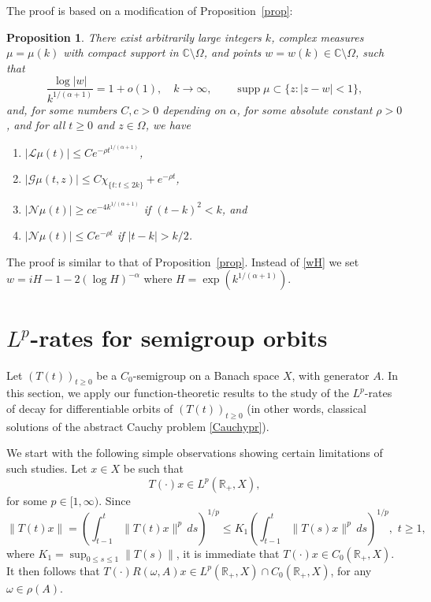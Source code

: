\documentclass[11pt]{amsart}
\newtheorem{proposition}[theorem]{Proposition}
\theoremstyle{definition}
\theoremstyle{remark}
\numberwithin{equation}{section}
\begin{document}
The proof is based on a modification of Proposition~\ref{prop}:

\begin{proposition}\label{propA}
There exist arbitrarily large integers $k$, complex measures $\mu=\mu(k)$ with compact support in $\mathbb C\setminus \Omega$, and points $w=w(k)\in \mathbb C\setminus \Omega$, such that
\begin{equation*} \label{wkA}
\frac{\log|w|}{k^{1/(\alpha+1)}} =1+o(1), \quad k\to\infty, \qquad {\operatorname{supp}}\mu\subset
\{z:|z-w|<1\},
\end{equation*}
and, for some numbers $C,c>0$ depending on $\alpha$, for some absolute constant $\rho>0$, and for all $t\ge0$ and $z \in \Omega$, we have
\begin{enumerate}[\rm(i)]
\item $\displaystyle  |\mathcal{L}\mu(t)|\le C e^{-\rho t^{1/(\alpha+1)}}$,
\vskip5pt
\item $\displaystyle |\mathcal{G}\mu(t,z)|\le
C\chi_{\{t:t\le 2k\}}+e^{-\rho t}$,
{\vskip5pt}
\item $\displaystyle |\mathcal{N}\mu(t)| \ge c e^{-4 k^{1/(\alpha+1)}}$
if $(t-k)^2<k$,  and
\vskip5pt
\item $\displaystyle |\mathcal{N}\mu(t)| \le C e^{-\rho t}$ if $|t-k|>k/2$.
\end{enumerate}
\end{proposition}

The proof is similar to that of Proposition~\ref{prop}. Instead of \eqref{wH} we set $w=iH-1-2(\log H)^{-\alpha}$ where $H=\exp \left(k^{1/(\alpha+1)}\right)$.

\section{$L^p$-rates for semigroup orbits} \label{sect6}

Let $(T(t))_{t \ge 0}$ be a $C_0$-semigroup on a Banach space $X$, with generator $A$.  In this section, we apply our function-theoretic results to the study of the $L^p$-rates of decay for differentiable orbits of $(T(t))_{t \ge 0}$ (in other words, classical solutions of the abstract Cauchy problem \eqref{Cauchypr}).

We start with the following simple observations showing certain limitations of such studies. Let $x \in X$ be such that
\begin{equation}\label{orbitlp} T(\cdot)x \in L^p(\mathbb R_+, X),
\end{equation}
for some $p \in [1,\infty)$.  Since
$$
\|T(t)x\| = \left(\int_{t-1}^t \|T(t)x\|^p \, ds\right)^{1/p} \le K_1 \left(\int_{t-1}^t \|T(s)x\|^p \, ds\right)^{1/p}, \,\, t\ge1,
$$
where $K_1 = \sup_{0\le s\le1} \|T(s)\|$, it is immediate that $T(\cdot)x \in C_0({{\mathbb R}}_+,X)$.  It then follows that $T(\cdot) R(\omega,A) x \in L^p({{\mathbb R}}_+,X) \cap C_0({{\mathbb R}}_+,X)$, for any $\omega  \in \rho(A)$.
\end{document}
